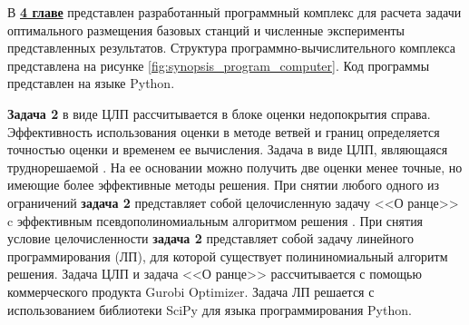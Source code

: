 









В \underline{\textbf{4 главе}} представлен разработанный программный комплекс для расчета задачи оптимального размещения базовых станций и численные эксперименты представленных результатов. Структура программно-вычислительного комплекса представлена на рисунке \ref{fig:synopsis_program_computer}. Код программы представлен на языке Python. 

\textbf{Задача 2} в виде ЦЛП рассчитывается в блоке оценки недопокрытия справа. Эффективность использования оценки в методе ветвей и границ определяется точностью оценки и временем ее вычисления. Задача в виде ЦЛП, являющаяся труднорешаемой \cite{Gari}. На ее основании можно получить две оценки менее точные, но имеющие более эффективные методы решения. При снятии любого одного из ограничений \textbf{задача 2}  представляет собой целочисленную задачу <<О ранце>> c эффективным псевдополиномиальным алгоритмом решения \cite{Gari}. При снятия условие целочисленности \textbf{задача 2} представляет собой задачу линейного программирования (ЛП), для которой существует полининомиальный алгоритм решения. Задача ЦЛП и задача <<О ранце>> рассчитывается с помощью коммерческого продукта Gurobi Optimizer. Задача ЛП решается с использованием библиотеки SciPy для языка программирования Python. 


